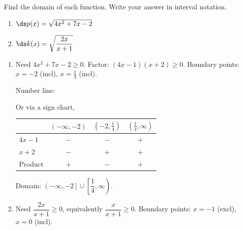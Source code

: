 \documentclass{ximera}
\begin{document}
\begin{problem}
Find the domain of each function. Write your answer in interval notation.
\begin{enumerate}
  \item[(a)] $\ds p(x) = \sqrt{4x^2+7x-2}$
  \medskip
  \item[(b)] $\ds k(x) = \sqrt{\dfrac{2x}{x+1}}$
\end{enumerate}

\begin{solution}
\begin{enumerate}
  \item[(a)] Need $4x^2+7x-2\geq 0$. Factor: $(4x-1)(x+2)\geq 0$. Boundary points: $x=-2$ (incl), $x=\tfrac{1}{4}$ (incl).

  Number line:
\begin{center}
\end{center}

  Or via a sign chart,
\begin{center}
\renewcommand{\arraystretch}{1.3}
\begin{tabular}{l|ccc}
 & $(-\infty,-2)$ & $(-2,\tfrac{1}{4})$ & $(\tfrac{1}{4},\infty)$ \\\hline
$4x-1$ & {\color{red}$-$} & {\color{red}$-$} & {\color{blue}$+$} \\
$x+2$ & {\color{red}$-$} & {\color{blue}$+$} & {\color{blue}$+$} \\\hline
Product & {\color{blue}$+$} & {\color{red}$-$} & {\color{blue}$+$}
\end{tabular}
\end{center}
  Domain: $\left(-\infty,-2\right]\cup\left[\dfrac{1}{4},\infty\right)$.

  \item[(b)] Need $\dfrac{2x}{x+1}\geq 0$, equivalently $\dfrac{x}{x+1}\geq 0$. Boundary points: $x=-1$ (excl), $x=0$ (incl).


\end{enumerate}
\end{solution}
\end{problem}
\end{document}
